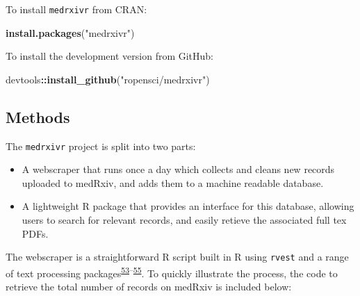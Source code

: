 \documentclass[a4paper, twoside]{templates/ociamthesis}
\providecommand{\tightlist}{%
  \setlength{\itemsep}{0pt}\setlength{\parskip}{0pt}}
\newenvironment{Shaded}{\begin{snugshade}}{\end{snugshade}}
\newcommand{\KeywordTok}[1]{\textcolor[rgb]{0.13,0.29,0.53}{\textbf{#1}}}
\newcommand{\NormalTok}[1]{#1}
\newcommand{\OperatorTok}[1]{\textcolor[rgb]{0.81,0.36,0.00}{\textbf{#1}}}
\newcommand{\StringTok}[1]{\textcolor[rgb]{0.31,0.60,0.02}{#1}}
\renewenvironment{Shaded}
{
  \vspace{4pt}%
  \begin{snugshade}%
}{%
  \end{snugshade}%
  \vspace{4pt}%
}
\begin{document}
To install \texttt{medrxivr} from CRAN:

\begin{Shaded}
\begin{Highlighting}[]
\KeywordTok{install.packages}\NormalTok{(}\StringTok{"medrxivr"}\NormalTok{)}
\end{Highlighting}
\end{Shaded}

To install the development version from GitHub:

\begin{Shaded}
\begin{Highlighting}[]
\NormalTok{devtools}\OperatorTok{::}\KeywordTok{install_github}\NormalTok{(}\StringTok{"ropensci/medrxivr"}\NormalTok{)}
\end{Highlighting}
\end{Shaded}

\hypertarget{methods-2}{%
\subsection{Methods}\label{methods-2}}

The \texttt{medrxivr} project is split into two parts:

\begin{itemize}
\tightlist
\item
  A webscraper that runs once a day which collects and cleans new records uploaded to medRxiv, and adds them to a machine readable database.
\item
  A lightweight R package that provides an interface for this database, allowing users to search for relevant records, and easily retieve the associated full tex PDFs.
\end{itemize}

The webscraper is a straightforward R script built in R using \texttt{rvest} and a range of text processing packages\textsuperscript{\protect\hyperlink{ref-wickham2019}{53}--\protect\hyperlink{ref-wickham2020}{55}}. To quickly illustrate the process, the code to retrieve the total number of records on medRxiv is included below:
\end{document}
